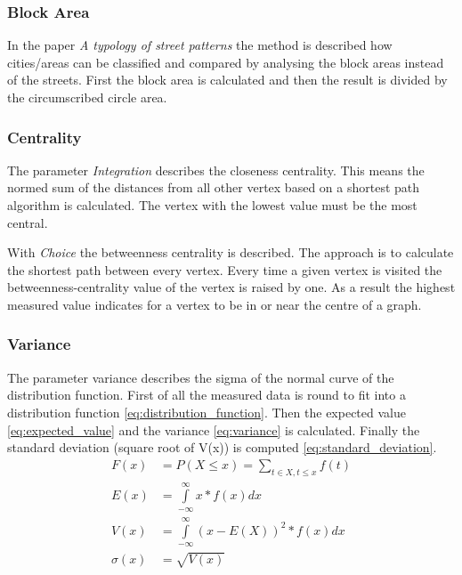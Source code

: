\subsubsection{Block Area}
In the paper \textit{A typology of street patterns}\citep{blockArea:2014} the method is described how cities/areas can be classified and compared by analysing the block areas instead of the streets. First the block area is calculated and then the result is divided by the circumscribed circle area.

\subsubsection{Centrality}
The parameter \textit{Integration} describes the closeness centrality. This means the normed sum of the distances from all other vertex based on a shortest path algorithm is calculated. The vertex with the lowest value must be the most central.

With \textit{Choice} the betweenness centrality is described. The approach is to calculate the shortest path between every vertex. Every time a given vertex is visited the betweenness-centrality value of the vertex is raised by one. As a result the highest measured value indicates for a vertex to be in or near the centre of a graph.

\subsubsection{Variance}
The parameter variance describes the sigma of the normal curve of the distribution function.
First of all the measured data is round to fit into a distribution function \ref{eq:distribution_function}. Then the expected value \ref{eq:expected_value} and the variance \ref{eq:variance} is calculated. Finally the standard deviation (square root of V(x)) is computed \ref{eq:standard_deviation}.
\begin{align}
\label{eq:distribution_function} 
F(x) &= P(X \leq x) =  \sum_{t\in{X}, t\leq{x}}{f(t)} \\
\label{eq:expected_value} 
E(x) &= \int\limits_{-\infty}^\infty x * f(x)dx \\
\label{eq:variance} 
V(x) &= \int\limits_{-\infty}^\infty (x - E(X))^2 * f(x)dx \\
\label{eq:standard_deviation} 
\sigma(x) &= \sqrt{V(x)}
\end{align}

